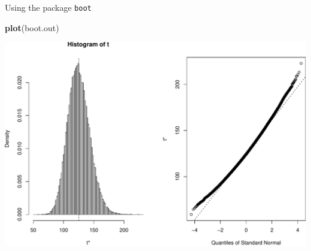 \documentclass[
  ignorenonframetext,
]{beamer}
\newenvironment{Shaded}{\begin{snugshade}}{\end{snugshade}}
\newcommand{\FunctionTok}[1]{\textcolor[rgb]{0.13,0.29,0.53}{\textbf{#1}}}
\newcommand{\NormalTok}[1]{#1}
\begin{document}
\begin{frame}[fragile]{Using the package \texttt{boot}}
\protect\hypertarget{using-the-package-boot-2}{}
\tiny

\begin{Shaded}
\begin{Highlighting}[]
\FunctionTok{plot}\NormalTok{(boot.out)}
\end{Highlighting}
\end{Shaded}

\begin{center}\includegraphics[width=0.8\linewidth,height=0.45\textheight]{Week11_12_13_files/figure-beamer/unnamed-chunk-29-1} \end{center}
\normalsize
\end{frame}
\end{document}
